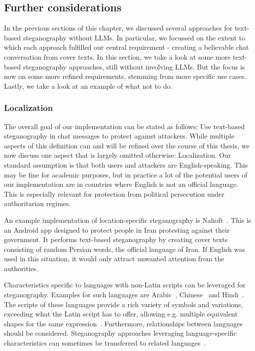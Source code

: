 \subsection{Further considerations}
\label{sec:furtherConsiderations}
In the previous sections of this chapter, we discussed several approaches for text-based steganography without \glspl{LLM}. In particular, we focussed on the extent to which each approach fulfilled our central requirement - creating a believable chat conversation from cover texts. In this section, we take a look at some more text-based steganography approaches, still without involving \glspl{LLM}. But the focus is now on some more refined requirements, stemming from more specific use cases. Lastly, we take a look at an example of what not to do.

\subsubsection{Localization}
\label{sec:localization}
The overall goal of our implementation can be stated as follows: Use text-based steganography in chat messages to protect against attackers. While multiple aspects of this definition can and will be refined over the course of this thesis, we now discuss one aspect that is largely omitted otherwise: Localization. Our standard assumption is that both users and attackers are English-speaking. This may be fine for academic purposes, but in practice a lot of the potential users of our implementation are in countries where English is not an official language. This is especially relevant for protection from political persecution under authoritarian regimes.

An example implementation of location-specific steganography is Nahoft~\cite{united4iranNahoft2021,united4iranU4iadminNahoft2025}. This is an Android app designed to protect people in Iran protesting against their government. It performs text-based steganography by creating cover texts consisting of random Persian words, the official language of Iran. If English was used in this situation, it would only attract unwanted attention from the authorities.

Characteristics specific to languages with non-Latin scripts can be leveraged for steganography. Examples for such languages are Arabic~\cite{shirali-shahrezaNewApproachPersian2006,hamzahLinguisticSteganographyFramework2021,thabitComparativeAnalysisArabic2021}, Chinese~\cite{luoTextSteganographyHigh2017} and Hindi~\cite{allaEvolutionHindiText2009}. The scripts of these languages provide a rich variety of symbols and variations, exceeding what the Latin script has to offer, allowing e.g. multiple equivalent shapes for the same expression~\cite{shirali-shahrezaNewApproachPersian2006,hamzahLinguisticSteganographyFramework2021,thabitComparativeAnalysisArabic2021}. Furthermore, relationships between languages should be considered. Steganography approaches leveraging language-specific characteristics can sometimes be transferred to related languages~\cite{allaEvolutionHindiText2009}.

